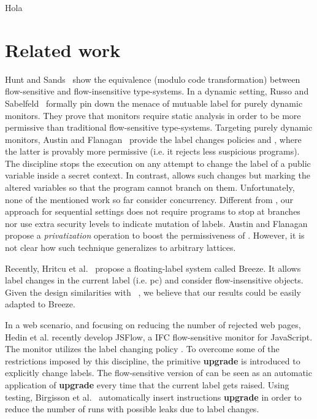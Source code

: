 \newpage  
Hola 
\newpage 
\section{Related work}

Hunt and Sands~\citep{Hunt:2006} show the equivalence (modulo code
transformation) between flow-sensitive and flow-insensitive type-systems. In a
dynamic setting, Russo and Sabelfeld~\citep{Russo:2010} formally pin down the
menace of mutuable label for purely dynamic monitors. They prove that monitors
require static analysis in order to be more permissive than traditional
flow-sensitive type-systems. Targeting purely dynamic monitors, Austin and
Flanagan~\citep{Austin:Flanagan:PLAS10} provide the label changes policies
\emph{\nsu} and \emph{\pu}, where the latter is provably more permissive
(i.e. it rejects less suspicious programs). The discipline
{\nsu} stops the execution on any attempt to change the label of a public
variable inside a secret context. In contrast, {\pu} allows such changes but
marking the altered variables so that the program cannot branch on
them. Unfortunately, none of the mentioned work so far consider
concurrency. Different from {\pu}, our approach for sequential settings does not
require programs to stop at branches nor use extra security levels to indicate
mutation of labels. Austin and Flanagan propose a \emph{privatization} operation
to boost the permissiveness of {\pu}.  However, it is not clear how such
technique generalizes to arbitrary lattices.  

Recently, Hritcu et al.~\citep{10.1109/SP.2013.10} propose a floating-label
system called Breeze. It allows label changes in the current label (i.e. pc) and
consider flow-insensitive objects. Given the design similarities with
\LIO~\citep{stefan:lio}, we believe that our results could be easily adapted to
Breeze.

In a web scenario, and focusing on reducing the number of rejected web pages,
Hedin et al. \citep{Hedin13} recently develop JSFlow, a IFC flow-sensitive
monitor for JavaScript. The monitor utilizes the label changing policy
{\nsu}. To overcome some of the restrictions imposed by this discipline, the
primitive \textbf{upgrade} is introduced to explicitly change labels. The
flow-sensitive version of {\forkLIO} can be seen as an automatic application of
\textbf{upgrade} every time that the current label gets raised. Using testing,
Birgisson et al.~\citep{Arnar2012} automatically insert instructions
\textbf{upgrade} in order to reduce the number of runs with possible leaks due
to label changes.



